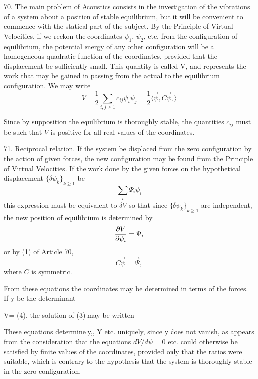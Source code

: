 70. The main problem of Acoustics consists in the investigation of the
vibrations of a system about a position of stable equilibrium, but it will be
convenient to commence with the statical part of the subject. By the Principle
of Virtual Velocities, if we reckon the coordinates \(\psi_1\), \(\psi_2\),
etc. from the configuration of equilibrium, the potential energy of any other
configuration will be a homogeneous quadratic function of the coordinates,
provided that the displacement be sufficiently small. This quantity is called
V, and represents the work that may be gained in passing from the actual to the
equilibrium configuration. We may write
\begin{equation} V = \frac{1}{2} \sum_{i,j\geq 1} c_{ij} \psi_{i} \psi_{j}
= \frac{1}{2} \langle \vec{ \psi}, C \vec{ \psi}, \rangle
\end{equation}

Since by supposition the equilibrium is thoroughly stable, the quantities
\(c_{ij}\)
must be such that \(V\) is positive for all real values of the
coordinates.

\setcounter{equation}{0}

71. Reciprocal relation.
If the system be displaced from the zero configuration by the action of
given forces, the new configuration may be found from the Principle of Virtual
Velocities. If the work done by the given forces on the hypothetical
displacement \( {\{\delta \psi_k\}}_{k\geq 1} \) be
\begin{equation}
\sum_i \Psi_{i} \psi_{i}
\end{equation}
this expression must be equivalent to
\( \delta V\)
so that since
\( {\{\delta \psi_k\}}_{k\geq 1} \)
 are independent, the new position
of equilibrium is determined by
\begin{equation}
\frac{\partial V}{\partial \psi_i} = \Psi_{i}
\end{equation}
or by (1) of Article 70,
\begin{equation}
C \vec{ \psi}= \vec{\Psi},
\end{equation}
where \(C\) is symmetric.

From these equations the coordinates may be determined in terms of the forces.
If y be the determinant

V= (4), the solution of (3) may be written

These equations determine y,, Y etc. uniquely, since y does not vanish, as
appears from the consideration that the equations \(d V / d \psi = 0\) etc.
could otherwise be satisfied by finite values of the coordinates, provided only
that the ratios were suitable, which is contrary to the hypothesis that the
system is thoroughly stable in the zero configuration.

